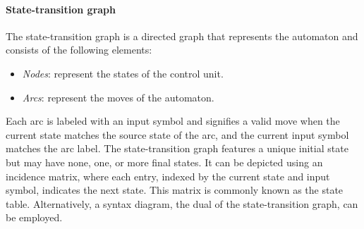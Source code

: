 \paragraph*{State-transition graph}
The state-transition graph is a directed graph that represents the automaton and consists of the following elements:
\begin{itemize}
    \item \textit{Nodes}: represent the states of the control unit. 
    \item \textit{Arcs}: represent the moves of the automaton. 
\end{itemize}
Each arc is labeled with an input symbol and signifies a valid move when the current state matches the source state of the arc, and the current input symbol matches the arc label. 
The state-transition graph features a unique initial state but may have none, one, or more final states. 
It can be depicted using an incidence matrix, where each entry, indexed by the current state and input symbol, indicates the next state. 
This matrix is commonly known as the state table. 
Alternatively, a syntax diagram, the dual of the state-transition graph, can be employed.
